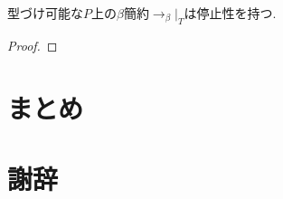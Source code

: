 \documentclass[12pt]{ltjsarticle}
\begin{document}

\begin{thm}
 型づけ可能な$P$上の$\beta$簡約$\rightarrow_{\beta}|_T$は停止性を持つ.
\end{thm}
\begin{proof}
\end{proof}


\section{まとめ}

\section{謝辞}



\end{document}
